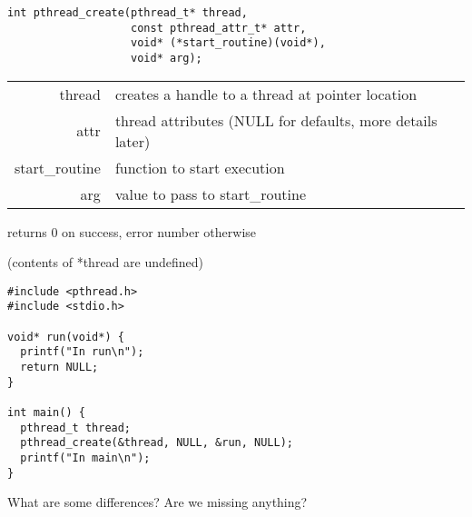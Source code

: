   \begin{slide}


    \begin{verbatim}
int pthread_create(pthread_t* thread, 
                   const pthread_attr_t* attr,
                   void* (*start_routine)(void*),
                   void* arg);
    \end{verbatim}
    \medskip

    \begin{tabular}{rl}
      thread & creates a handle to a thread at pointer location \\

      attr & thread attributes (NULL for defaults, more details later) \\

      start\_routine & function to start execution \\

      arg & value to pass to start\_routine \\
    \end{tabular}

    returns 0 on success, error number otherwise
    
    \leftspace{}(contents of *thread are undefined)

  \end{slide}

  \begin{slide}


    \begin{verbatim}
#include <pthread.h>
#include <stdio.h>

void* run(void*) {
  printf("In run\n");
  return NULL;
}

int main() {
  pthread_t thread;
  pthread_create(&thread, NULL, &run, NULL);
  printf("In main\n");
}
    \end{verbatim}
    \medskip

    What are some differences? Are we missing anything?

  \end{slide}

